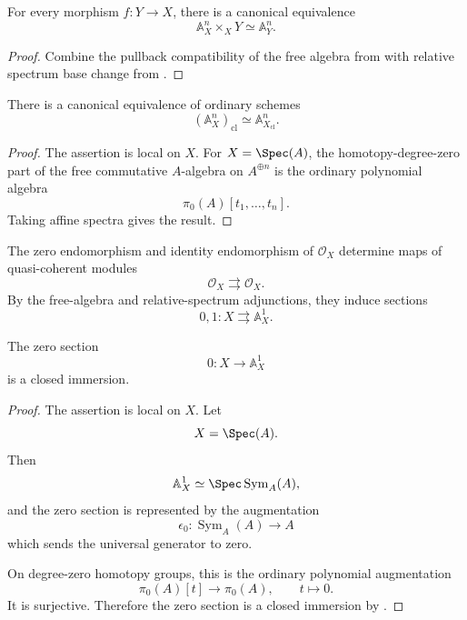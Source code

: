 \begin{proposition}
\label{prop:affine-space-base-change}
For every morphism $f:Y\to X$, there is a canonical equivalence
\[
    \mathbb A_X^n
    \times_X
    Y
    \simeq
    \mathbb A_Y^n.
\]
\end{proposition}

\begin{proof}
Combine the pullback compatibility of the free algebra from
 with relative spectrum base
change from .
\end{proof}

\begin{proposition}
\label{prop:classical-truncation-affine-space}
There is a canonical equivalence of ordinary schemes
\[
    (\mathbb A_X^n)_{\mathrm{cl}}
    \simeq
    \mathbb A_{X_{\mathrm{cl}}}^n.
\]
\end{proposition}

\begin{proof}
The assertion is local on $X$. For $X=\Spec(A)$, the homotopy-degree-zero
part of the free commutative $A$-algebra on $A^{\oplus n}$ is the ordinary
polynomial algebra
\[
    \pi_0(A)[t_1,\ldots,t_n].
\]
Taking affine spectra gives the result.
\end{proof}

\begin{construction}
\label{con:zero-unit-sections-affine-line}
The zero endomorphism and identity endomorphism of $\mathcal O_X$ determine
maps of quasi-coherent modules
\[
    \mathcal O_X
    \rightrightarrows
    \mathcal O_X.
\]
By the free-algebra and relative-spectrum adjunctions, they induce sections
\[
    0,1
    \colon
    X
    \rightrightarrows
    \mathbb A_X^1.
\]
\end{construction}

\begin{proposition}
\label{prop:zero-section-affine-line-closed}
The zero section
\[
    0
    \colon
    X
    \longrightarrow
    \mathbb A_X^1
\]
is a closed immersion.
\end{proposition}

\begin{proof}
The assertion is local on $X$. Let
\[
    X=\Spec(A).
\]
Then
\[
    \mathbb A_X^1
    \simeq
    \Spec
    \operatorname{Sym}_A(A),
\]
and the zero section is represented by the augmentation
\[
    \epsilon_0
    \colon
    \operatorname{Sym}_A(A)
    \longrightarrow
    A
\]
which sends the universal generator to zero.

On degree-zero homotopy groups, this is the ordinary polynomial
augmentation
\[
    \pi_0(A)[t]
    \longrightarrow
    \pi_0(A),
    \qquad
    t
    \longmapsto
    0.
\]
It is surjective. Therefore the zero section is a closed immersion by
.
\end{proof}

